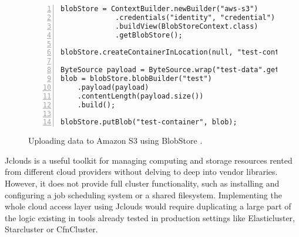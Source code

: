 \begin{figure}[H]
	\centering
	\begin{minipage}{12.5cm}
		\begin{Verbatim}[fontsize=\small, numbers=left, frame=single]
blobStore = ContextBuilder.newBuilder("aws-s3")
             .credentials("identity", "credential")
             .buildView(BlobStoreContext.class)
             .getBlobStore();

blobStore.createContainerInLocation(null, "test-container");

ByteSource payload = ByteSource.wrap("test-data".getBytes(UTF_8));
blob = blobStore.blobBuilder("test")
    .payload(payload)
    .contentLength(payload.size())
    .build();

blobStore.putBlob("test-container", blob);
		\end{Verbatim}
	\end{minipage}
	\caption{Uploading data to Amazon S3 using BlobStore \cite{jclouds}.}
	\label{BlobStore}
\end{figure}

Jclouds is a useful toolkit for managing computing and storage resources rented from different cloud providers without delving to deep into vendor libraries. However, it does not provide full cluster functionality, such as installing and configuring a job scheduling system or a shared filesystem. Implementing the whole cloud access layer using Jclouds would require duplicating a large part of the logic existing in tools already tested in production settings like Elasticluster, Starcluster or CfnCluster.